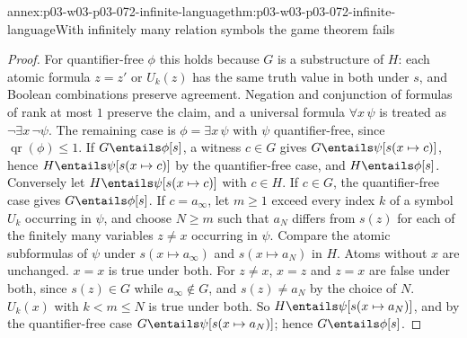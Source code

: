 \begin{annexitem}{annex:p03-w03-p03-072-infinite-language}{thm:p03-w03-p03-072-infinite-language}{With infinitely many relation symbols the game theorem fails}
\begin{proof}
For quantifier-free \(\phi\) this holds because \(G\) is a substructure of
\(H\): each atomic formula \(z=z'\) or \(U_k(z)\) has the same truth value
in both under \(s\), and Boolean combinations preserve agreement.  Negation
and conjunction of formulas of rank at most \(1\) preserve the claim, and
a universal formula \(\forall x\,\psi\) is treated as \(\neg\exists x\,\neg\psi\).  The
remaining case is \(\phi=\exists x\,\psi\) with \(\psi\) quantifier-free,
since \(\operatorname{qr}(\phi)\leq1\).  If \(G\entails\phi[s]\), a witness
\(c\in G\) gives \(G\entails\psi[s(x\mapsto c)]\), hence
\(H\entails\psi[s(x\mapsto c)]\) by the quantifier-free case, and
\(H\entails\phi[s]\).  Conversely let \(H\entails\psi[s(x\mapsto c)]\) with
\(c\in H\).  If \(c\in G\), the quantifier-free case gives
\(G\entails\phi[s]\).  If \(c=a_\infty\), let \(m\geq1\) exceed every index
\(k\) of a symbol \(U_k\) occurring in \(\psi\), and choose \(N\geq m\) such
that \(a_N\) differs from \(s(z)\) for each of the finitely many variables
\(z\neq x\) occurring in \(\psi\).  Compare the atomic subformulas of
\(\psi\) under \(s(x\mapsto a_\infty)\) and \(s(x\mapsto a_N)\) in \(H\).
Atoms without \(x\) are unchanged.  \(x=x\) is true under both.  For
\(z\neq x\), \(x=z\) and \(z=x\) are false under both, since
\(s(z)\in G\) while \(a_\infty\notin G\), and \(s(z)\neq a_N\) by the choice
of \(N\).  \(U_k(x)\) with \(k<m\leq N\) is true under both.  So
\(H\entails\psi[s(x\mapsto a_N)]\), and by the quantifier-free case
\(G\entails\psi[s(x\mapsto a_N)]\); hence \(G\entails\phi[s]\).
\end{proof}
\end{annexitem}

